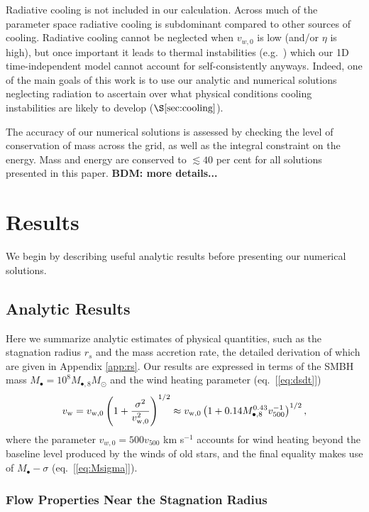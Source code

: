 \documentclass[usenatbib,fleqn]{mn2e}
\newcommand{\rs}{r_s}
\newcommand{\Mbheight}{M_{\bullet,8}}
\newcommand{\vwO}{v_{w,0}}
\begin{document}
Radiative cooling is not included in our calculation.  Across much of the parameter space radiative cooling is subdominant compared to other sources of cooling.  Radiative cooling cannot be neglected when $\vwO$ is low (and/or $\eta$ is high), but once important it leads to thermal instabilities (e.g.~\citealt{McCourt+12}) which our 1D time-independent model cannot account for self-consistently anyways.  Indeed, one of the main goals of this work is to use our analytic and numerical solutions neglecting radiation to ascertain over what physical conditions cooling instabilities are likely to develop ($\S\ref{sec:cooling}$).

The accuracy of our numerical solutions is assessed by checking the level of conservation of mass across the grid, as well as the integral constraint on the energy.  Mass and energy are conserved to $\lesssim
40$ per cent for all solutions presented in this paper. 
{\bf BDM: more details...}


\section{Results}

We begin by describing useful analytic results before presenting our numerical solutions.  

\label{sec:results}
\subsection{Analytic Results}

Here we summarize analytic estimates of physical quantities, such as the stagnation radius $\rs$ and the mass accretion rate, the detailed derivation of which are given in Appendix \ref{app:rs}.  Our results are expressed in terms of the SMBH mass $M_{\bullet} = 10^{8}M_{\bullet,8}M_{\odot}$ and the wind heating parameter (eq.~[\ref{eq:dsdt}])
\begin{eqnarray}
v_{\rm w} = v_{\rm w,0}\left(1+\frac{\sigma^{2}}{v_{\rm w,0}^{2}}\right)^{1/2} 
 \approx v_{\rm w,0}\left(1+0.14 \Mbheight^{0.43}v_{500}^{-1}\right)^{1/2},
\end{eqnarray}
where the parameter $\vwO = 500 v_{500}$ km s$^{-1}$ accounts for wind heating beyond the baseline level produced by the winds of old stars, and the final equality makes use of $M_{\bullet}-\sigma$ (eq.~[\ref{eq:Msigma}]).

\subsubsection{Flow Properties Near the Stagnation Radius}
\end{document}
